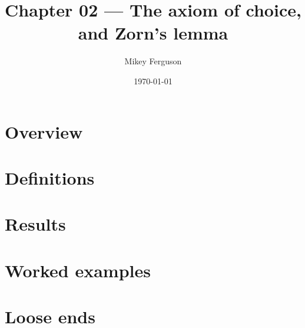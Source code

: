 \documentclass[11pt]{article}
\title{Chapter 02 --- The axiom of choice, and Zorn's lemma}
\author{Mikey Ferguson}
\date{\today}
\begin{document}
\maketitle
\tableofcontents
\bigskip

\section{Overview}

\section{Definitions}

\section{Results}

\section{Worked examples}

\section{Loose ends}
\end{document}
